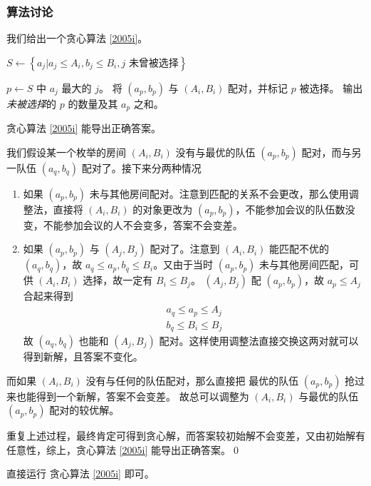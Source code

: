 			\subsubsection{算法讨论}
				我们给出一个贪心算法 \ref{2005i}。
				\begin{algorithm}[H]
				\caption{}
				\label{2005i}
					\begin{algorithmic}[1]
								\State $S \gets \left\{a_j| a_j \le A_i, b_j  \le B_i, j \text{ 未曾被选择}\right\}$
								
									\State $p \gets S$ 中 $a_j$ 最大的 $j$。
									\State 将 $(a_p, b_p)$ 与  $(A_i, B_i)$ 配对，并标记 $p$ 被选择。
								\EndIf
						\EndFor
						\State 输出\emph{未被选择}的 $p$ 的数量及其 $a_p$ 之和。
					\end{algorithmic}
				\end{algorithm}	
				\begin{theorem}
					贪心算法 \ref{2005i} 能导出正确答案。
				\end{theorem}
				\begin{pf}
					我们假设某一个枚举的房间  $(A_i, B_i)$ 没有与最优的队伍 $(a_p, b_p)$ 配对，而与另一队伍  $(a_q, b_q)$  配对了。接下来分两种情况 
					\begin{enumerate}
						\item 如果    $(a_p, b_p)$   未与其他房间配对。注意到匹配的关系不会更改，那么使用调整法，直接将 $(A_i, B_i)$ 的对象更改为  $(a_p, b_p)$，不能参加会议的队伍数没变，不能参加会议的人不会变多，答案不会变差。
						\item 如果    $(a_p, b_p)$ 与 $(A_j, B_j)$  配对了。注意到 $(A_i, B_i)$  能匹配不优的   $(a_q, b_q)$，故
							$a_q \le a_p %
						, b_q \le B_i$。又由于当时  $(a_p, b_p)$  未与其他房间匹配，可供   $(A_i, B_i)$ 选择，故一定有 $B_i \le B_j$。 $(A_j, B_j)$   配    $(a_p, b_p)$，故 $a_p \le A_j $ 合起来得到
							\begin{align}
								a_q \le a_p \le A_j \\
								 b_q \le B_i \le  B_j
							\end{align}
							故 $(a_q, b_q)$ 也能和 $(A_j, B_j)$ 配对。这样使用调整法直接交换这两对就可以得到新解，且答案不变化。
					\end{enumerate} 
					而如果   $(A_i, B_i)$ 没有与任何的队伍配对，那么直接把 最优的队伍 $(a_p, b_p)$  抢过来也能得到一个新解，答案不会变差。
					故总可以调整为  $(A_i, B_i)$ 与最优的队伍 $(a_p, b_p)$ 配对的较优解。
					
					重复上述过程，最终肯定可得到贪心解，而答案较初始解不会变差，又由初始解有任意性，综上，贪心算法 \ref{2005i} 能导出正确答案。\qed
				\end{pf}
					直接运行 贪心算法 \ref{2005i} 即可。
